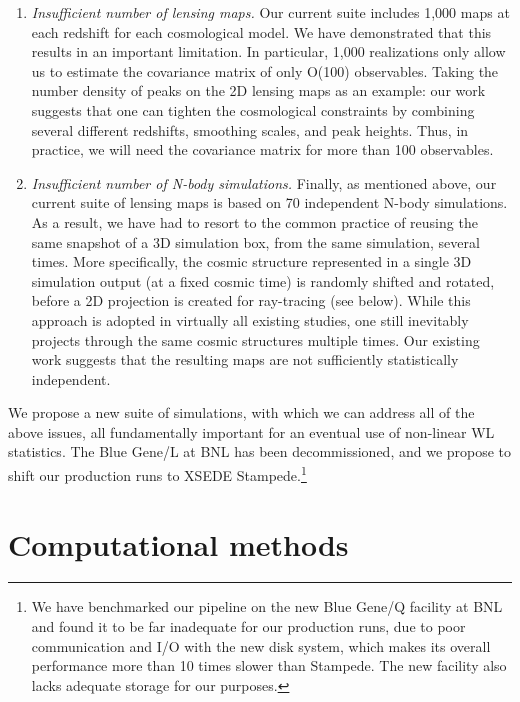 \documentclass[10pt, preprint]{aastex}
\begin{document}
\begin{enumerate}
\vspace{-0.5\baselineskip}
\item {\em Insufficient number of lensing maps.}  Our current suite
  includes 1,000 maps at each redshift for each cosmological model.
  We have demonstrated that this results in an important
  limitation. In particular, 1,000 realizations only allow us to
  estimate the covariance matrix of only O(100) observables.  Taking
  the number density of peaks on the 2D lensing maps as an example:
  our work suggests that one can tighten the cosmological constraints
  by combining several different redshifts, smoothing scales, and peak
  heights. Thus, in practice, we will need the covariance matrix for
  more than 100 observables.

\vspace{-0.5\baselineskip}
\item {\em Insufficient number of N-body simulations.}  Finally, as
  mentioned above, our current suite of lensing maps is based on 70
  independent N-body simulations. As a result, we have had to resort
  to the common practice of reusing the same snapshot of a 3D
  simulation box, from the same simulation, several times.  More
  specifically, the cosmic structure represented in a single 3D
  simulation output (at a fixed cosmic time) is randomly shifted and
  rotated, before a 2D projection is created for ray-tracing (see
  below).  While this approach is adopted in virtually all existing
  studies, one still inevitably projects through the same cosmic
  structures multiple times.  Our existing work suggests that the
  resulting maps are not sufficiently statistically independent.

\end{enumerate}

\vspace{-0.25\baselineskip} We propose a new suite of simulations,
with which we can address all of the above issues, all fundamentally
important for an eventual use of non-linear WL statistics.  The Blue
Gene/L at BNL has been decommissioned, and we propose to shift our
production runs to XSEDE Stampede.\footnote{We have benchmarked our
  pipeline on the new Blue Gene/Q facility at BNL and found it to be
  far inadequate for our production runs, due to poor communication
  and I/O with the new disk system, which makes its overall
  performance more than 10 times slower than Stampede. The new
  facility also lacks adequate storage for our purposes.}

\section{Computational methods}
\label{Computational}
\end{document}
